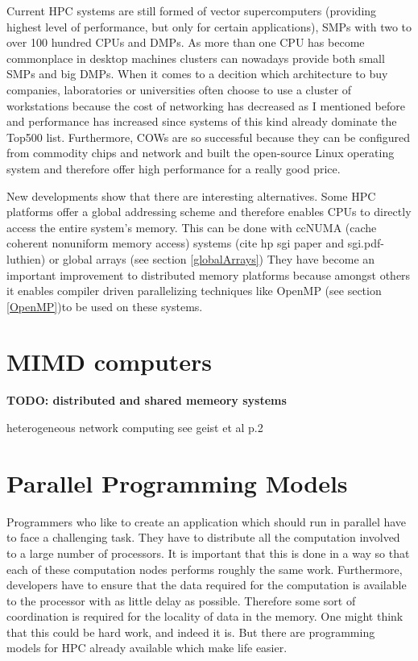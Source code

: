 Current HPC systems are still formed of vector supercomputers
(providing highest level of performance, but only for certain
applications), SMPs with two to over 100 hundred CPUs and DMPs. As
more than one CPU has become commonplace in desktop machines clusters
can nowadays provide both small SMPs and big DMPs. When it comes to a
decition which architecture to buy companies, laboratories or
universities often choose to use a cluster of workstations because the
cost of networking has decreased as I mentioned before and performance
has increased since systems of this kind already dominate the Top500
list. Furthermore, COWs are so successful because they can be
configured from commodity chips and network and built the open-source
Linux operating system and therefore offer high performance for a
really good price.

New developments show that there are interesting alternatives. Some
HPC platforms offer a global addressing scheme and therefore enables
CPUs to directly access the entire system's memory. This can be done
with ccNUMA (cache coherent nonuniform memory access) systems (cite hp
sgi paper and sgi.pdf-luthien) or
global arrays (see section \ref{globalArrays})
They have become an important improvement to distributed memory
platforms because amongst others it enables compiler driven
parallelizing techniques like OpenMP (see section \ref{OpenMP})to be
used on these systems. 

\section{MIMD computers}
\label{sec:mimd_computers}


\textbf{TODO: distributed and shared memeory systems}

heterogeneous network computing see geist et al p.2

\section{Parallel Programming Models}
\label{sec:programming_models}

Programmers who like to create an application which should run in
parallel have to face a challenging task. They have to distribute all
the computation involved to a large number of processors. It is
important that this is done in a way so that each of these computation
nodes performs roughly the same work. Furthermore, developers have to
ensure that the data required for the computation is available to the
processor with as little delay as possible. Therefore some sort of
coordination is required for the locality of data in the memory.
One might think that this could be hard work, and indeed it is. But
there are programming models for HPC already available which make life
easier.

